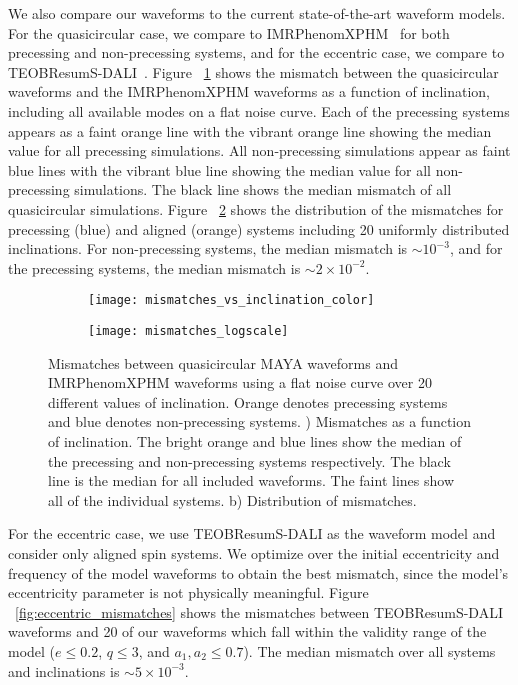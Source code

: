\documentclass[
twocolumn,prd,
showpacs,
nofootinbib,
amsmath,amssymb,
superscriptaddress]{revtex4-1}
\begin{document}
We also compare our waveforms to the current state-of-the-art waveform models.
For the quasicircular case, we compare to IMRPhenomXPHM~\cite{Pratten:2020ceb} for both precessing and non-precessing systems, and for the eccentric case, we compare to TEOBResumS-DALI~\cite{Chiaramello:2020ehz, Nagar:2021gss, Nagar:2021xnh, Placidi:2021rkh}. 
Figure ~\ref{fig:mismatches_vs_inclination} shows the mismatch between the quasicircular \nr{} waveforms and the IMRPhenomXPHM waveforms as a function of inclination, including all available modes on a flat noise curve. 
Each of the precessing systems appears as a faint orange line with the vibrant orange line showing the median value for all precessing simulations.
All non-precessing simulations appear as faint blue lines with the vibrant blue line showing the median value for all non-precessing simulations. 
The black line shows the median mismatch of all quasicircular simulations.
Figure ~\ref{fig:mismatch_distribution} shows the distribution of the mismatches for precessing (blue) and aligned (orange) systems including 20 uniformly distributed inclinations.
For non-precessing systems, the median mismatch is $\sim 10^{-3}$, and for the precessing systems, the median mismatch is $\sim 2 \times 10^{-2}$.

\begin{figure*}
\centering
\begin{subfigure}[t]{.48\textwidth}
    \centering
   \texttt{[image: mismatches\_vs\_inclination\_color]}
    \caption{}
    \label{fig:mismatches_vs_inclination}
\end{subfigure}
\begin{subfigure}[t]{.48\textwidth}
    \centering
    \texttt{[image: mismatches\_logscale]}
 	\caption{}
 	\label{fig:mismatch_distribution}
\end{subfigure}
\caption{Mismatches between quasicircular MAYA waveforms and IMRPhenomXPHM waveforms using a flat noise curve over 20 different values of inclination. Orange denotes precessing systems and blue denotes non-precessing systems. ) Mismatches as a function of inclination.  The bright orange and blue lines show the median of the precessing and non-precessing systems respectively.  The black line is the median for all included waveforms. The faint lines show all of the individual systems.  b) Distribution of mismatches.} 
\label{fig:model_mismatches}
\end{figure*}

For the eccentric case, we use TEOBResumS-DALI as the waveform model and consider only aligned spin systems.
We optimize over the initial eccentricity and frequency of the model waveforms to obtain the best mismatch, since the model's eccentricity parameter is not physically meaningful.
Figure ~\ref{fig:eccentric_mismatches} shows the mismatches between TEOBResumS-DALI waveforms and 20 of our waveforms which fall within the validity range of the model ($e \leq 0.2$,  $q \leq 3$,  and $a_1, a_2 \leq 0.7$). 
The median mismatch over all systems and inclinations is $\sim 5 \times 10^{-3}$.
\end{document}
